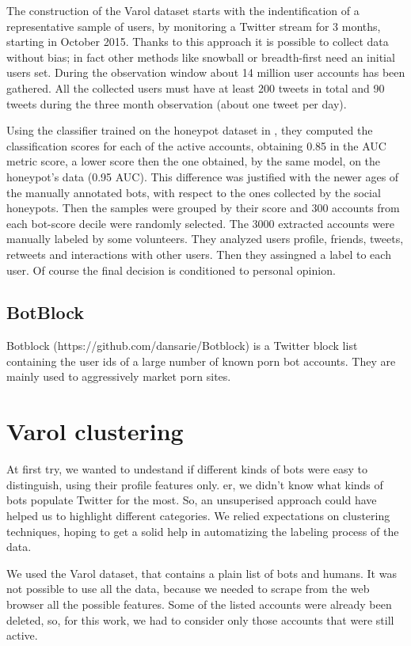 The construction of the Varol dataset starts with the indentification of a representative sample of users, by monitoring a Twitter stream for 3 months, starting in October 2015. Thanks to this approach it is possible to collect data without bias; in fact other methods like snowball or breadth-first need an initial users set.
During the observation window about 14 million user accounts has been gathered. 
All the collected users must have at least 200 tweets in total and 90 tweets during the three month observation (about one tweet per day).

Using the classifier trained on the honeypot dataset in \cite{Lee11sevenmonths}, they computed the classification scores for each of the active accounts, obtaining 0.85 in the AUC metric score, a lower score then the one obtained, by the same model, on the honeypot's data (0.95 AUC). This difference was justified with the newer ages of the manually annotated bots, with respect to the ones collected by the social honeypots.
Then the samples were grouped by their score and 300 accounts from each bot-score decile were randomly selected. 
The 3000 extracted accounts were manually labeled by some volunteers. They analyzed users profile, friends, tweets, retweets and interactions with other users. Then they assingned a label to each user.
Of course the final decision is conditioned to personal opinion\cite{Varol}.

\subsection{BotBlock}
Botblock (https://github.com/dansarie/Botblock) is a Twitter block list containing the user ids of a large number of known porn bot accounts.
They are mainly used to aggressively market porn sites.

\section{Varol clustering}
At first try, we wanted to undestand if different kinds of bots were easy to distinguish, using their profile features only. er, we didn't know what kinds of bots populate Twitter for the most. So, an unsuperised approach could have helped us to highlight different categories. We relied expectations on clustering techniques, hoping to get a solid help in automatizing the labeling process of the data.

We used the Varol dataset\cite{Varol}, that contains a plain list of bots and humans.
It was not possible to use all the data, because we needed to scrape from the web browser all the possible features. Some of the listed accounts were already been deleted, so, for this work, we had to consider only those accounts that were still active.


